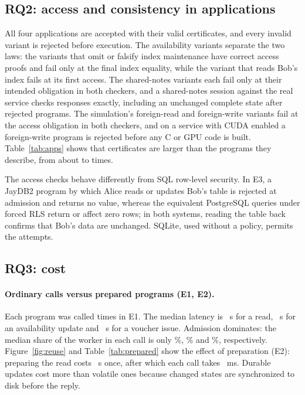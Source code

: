 \documentclass[12pt]{article}
\newcommand{\num}[1]{\pgfmathprintnumber[fixed,precision=2,1000 sep={\mathord{,}}]{#1}}
\begin{document}
\subsection{RQ2: access and consistency in applications}
All four applications are accepted with their valid certificates, and every
invalid variant is rejected before execution. The availability variants
separate the two laws: the variants that omit or falsify index maintenance have
correct access proofs and fail only at the final index equality, while the
variant that reads Bob's index fails at its first access. The \RlsNegativeFixtures{}
shared-notes variants each fail only at their intended obligation in both
checkers, and a shared-notes session against the real service checks \RlsNativeResponses{}
responses exactly, including an unchanged complete state after rejected
programs. The simulation's foreign-read and foreign-write variants fail at the access
obligation in both checkers, and on a service with CUDA enabled a
foreign-write program is rejected before any C or GPU code is built. Table~\ref{tab:apps} shows that
certificates are larger than the programs they describe, from about
\num{\VoucherProofRatio} to \num{\IndexedProofRatio} times.

The access checks behave differently from SQL row-level security. In E3, a
JayDB2 program by which Alice reads or updates Bob's table is rejected at
admission and returns no value, whereas the equivalent PostgreSQL queries under
forced RLS return or affect zero rows; in both systems, reading the table back confirms that
Bob's data are unchanged. SQLite, used without a policy, permits the attempts.

\subsection{RQ3: cost}
\paragraph{Ordinary calls versus prepared programs (E1, E2).}
Each program was called \OrdinarySamples{} times in E1. The median latency is
\num{\OrdinaryReadMedianSeconds}~s for a read,
\num{\OrdinaryIndexedMedianSeconds}~s for an availability update and
\num{\OrdinaryVoucherMedianSeconds}~s for a voucher issue. Admission dominates:
the median share of the worker in each call is only
\num{\OrdinaryReadWorkerSharePercent}\%, \num{\OrdinaryIndexedWorkerSharePercent}\%
and \num{\OrdinaryVoucherWorkerSharePercent}\%, respectively.
Figure~\ref{fig:reuse} and Table~\ref{tab:prepared} show the effect of
preparation (E2): preparing the read costs
\num{\RegistrationReadVolatileMedianSeconds}~s once, after which each call takes
\num{\PreparedReadVolatileMedianMs}~ms. Durable updates cost more than volatile
ones because changed states are synchronized to disk before the reply.
\end{document}
